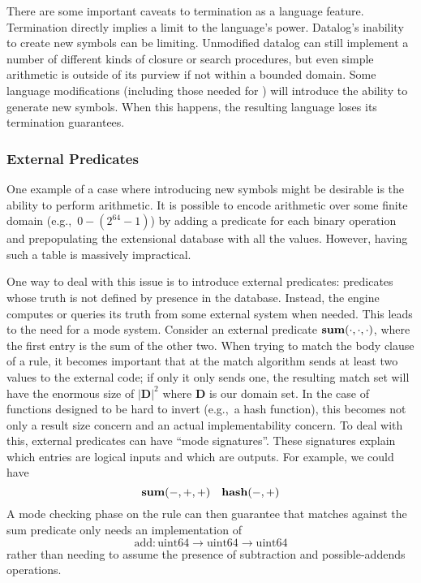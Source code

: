 There are some important caveats to termination as a language feature.
%
Termination directly implies a limit to the language's power.
Datalog's inability to create new symbols can be limiting.
Unmodified datalog can still implement a number of different kinds of closure or search procedures, but even simple arithmetic is outside of its purview if not within a bounded domain.
%
Some language modifications (including those needed for \sysname) will introduce the ability to generate new symbols.
When this happens, the resulting language loses its termination guarantees.
\subsubsection{External Predicates}
\label{sec:extpred}
One example of a case where introducing new symbols might be desirable is the ability to perform arithmetic.
It is possible to encode arithmetic over some finite domain (e.g.,\ $0-(2^{64} - 1)$) by adding a predicate for each binary operation and prepopulating the extensional database with all the values.
However, having such a table is massively impractical.

One way to deal with this issue is to introduce external predicates: predicates whose truth is not defined by presence in the database.
Instead, the engine computes or queries its truth from some external system when needed.
This leads to the need for a mode system.
Consider an external predicate ${\bf sum}(\cdot, \cdot, \cdot)$, where the first entry is the sum of the other two.
When trying to match the body clause of a rule, it becomes important that at the match algorithm sends at least two values to the external code; if only it only sends one, the resulting match set will have the enormous size of $|\mathbf{D}|^2$ where $\mathbf{D}$ is our domain set.
In the case of functions designed to be hard to invert (e.g.,\ a hash function), this becomes not only a result size concern and an actual implementability concern.
To deal with this, external predicates can have ``mode signatures''.
These signatures explain which entries are logical inputs and which are outputs.
For example, we could have
\[
        {\bf sum}(-, +, +) \quad {\bf hash}(-, +)
\]
A mode checking phase on the rule can then guarantee that matches against the sum predicate only needs an implementation of
\[
        \textrm{add} : \textrm{uint64} \rightarrow \textrm{uint64} \rightarrow \textrm{uint64}
\]
rather than needing to assume the presence of subtraction and possible-addends operations.

